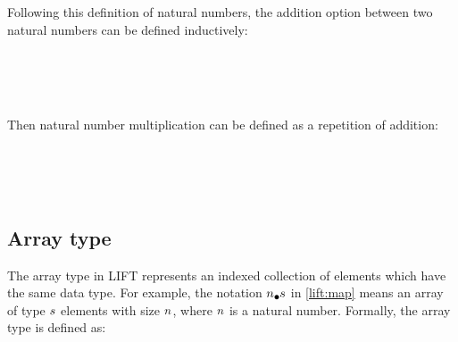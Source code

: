 \documentclass{l4proj}
\begin{document}
Following this definition of natural numbers, the addition option between two natural numbers can be defined inductively:
\begin{code}%
\>[0]\<%
\\
\>[0]\AgdaOperator{\AgdaFunction{\AgdaUnderscore{}+\AgdaUnderscore{}}}\AgdaSpace{}%
\AgdaSymbol{:}\AgdaSpace{}%
\AgdaSpace{}%
\AgdaSpace{}%
\AgdaSpace{}%
\AgdaSpace{}%
\<%
\\
\>[0]%
\>[6]\AgdaOperator{\AgdaFunction{+}}\AgdaSpace{}%
\AgdaSpace{}%
\AgdaSymbol{=}\AgdaSpace{}%
\<%
\\
\>[0]\AgdaSpace{}%
\AgdaSpace{}%
\AgdaOperator{\AgdaFunction{+}}\AgdaSpace{}%
\AgdaSpace{}%
\AgdaSymbol{=}\AgdaSpace{}%
\AgdaSpace{}%
\AgdaSymbol{(}\AgdaSpace{}%
\AgdaOperator{\AgdaFunction{+}}\AgdaSpace{}%
\AgdaSymbol{)}\<%
\end{code}

Then natural number multiplication can be defined as a repetition of addition:
\begin{code}%
\>[0]\<%
\\
\>[0]\AgdaOperator{\AgdaFunction{\AgdaUnderscore{}*\AgdaUnderscore{}}}\AgdaSpace{}%
\AgdaSymbol{:}\AgdaSpace{}%
\AgdaSpace{}%
\AgdaSpace{}%
\AgdaSpace{}%
\AgdaSpace{}%
\<%
\\
\>[0]%
\>[6]\AgdaOperator{\AgdaFunction{*}}\AgdaSpace{}%
\AgdaSpace{}%
\AgdaSymbol{=}\AgdaSpace{}%
\<%
\\
\>[0]\AgdaSpace{}%
\AgdaSpace{}%
\AgdaOperator{\AgdaFunction{*}}\AgdaSpace{}%
\AgdaSpace{}%
\AgdaSymbol{=}\AgdaSpace{}%
\AgdaSpace{}%
\AgdaOperator{\AgdaPrimitive{+}}\AgdaSpace{}%
\AgdaSpace{}%
\AgdaOperator{\AgdaFunction{*}}\AgdaSpace{}%
\<%
\end{code}

\subsection{Array type}
\label{datatype:array}
The array type in LIFT represents an indexed collection of elements which have the same data type. For example, the notation $\lArray{n}{\dtone}$ in \ref{lift:map} means an array of type $\dtone$ elements with size $\n$, where $\n$ is a natural number. Formally, the array type is defined as:
\begin{mathpar}
\end{mathpar}
\end{document}
